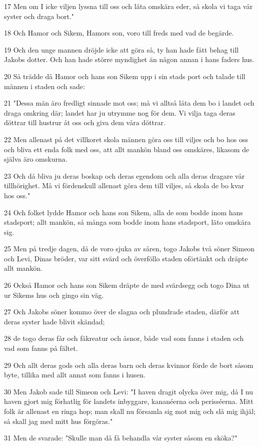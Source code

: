 \par 17 Men om I icke viljen lyssna till oss och låta omskära eder, så skola vi taga vår syster och draga bort."
\par 18 Och Hamor och Sikem, Hamors son, voro till freds med vad de begärde.
\par 19 Och den unge mannen dröjde icke att göra så, ty han hade fått behag till Jakobs dotter. Och han hade större myndighet än någon annan i hans faders hus.
\par 20 Så trädde då Hamor och hans son Sikem upp i sin stads port och talade till männen i staden och sade:
\par 21 "Dessa män äro fredligt sinnade mot oss; må vi alltså låta dem bo i landet och draga omkring där; landet har ju utrymme nog för dem. Vi vilja taga deras döttrar till hustrur åt oss och giva dem våra döttrar.
\par 22 Men allenast på det villkoret skola männen göra oss till viljes och bo hos oss och bliva ett enda folk med oss, att allt mankön bland oss omskäres, likasom de själva äro omskurna.
\par 23 Och då bliva ju deras boskap och deras egendom och alla deras dragare vår tillhörighet. Må vi fördenskull allenast göra dem till viljes, så skola de bo kvar hos oss."
\par 24 Och folket lydde Hamor och hans son Sikem, alla de som bodde inom hans stadsport; allt mankön, så många som bodde inom hans stadsport, läto omskära sig.
\par 25 Men på tredje dagen, då de voro sjuka av såren, togo Jakobs två söner Simeon och Levi, Dinas bröder, var sitt svärd och överföllo staden oförtänkt och dräpte allt mankön.
\par 26 Också Hamor och hans son Sikem dräpte de med svärdsegg och togo Dina ut ur Sikems hus och gingo sin väg.
\par 27 Och Jakobs söner kommo över de slagna och plundrade staden, därför att deras syster hade blivit skändad;
\par 28 de togo deras får och fäkreatur och åsnor, både vad som fanns i staden och vad som fanns på fältet.
\par 29 Och allt deras gods och alla deras barn och deras kvinnor förde de bort såsom byte, tillika med allt annat som fanns i husen.
\par 30 Men Jakob sade till Simeon och Levi: "I haven dragit olycka över mig, då I nu haven gjort mig förhatlig för landets inbyggare, kananéerna och perisséerna. Mitt folk är allenast en ringa hop; man skall nu församla sig mot mig och slå mig ihjäl; så skall jag med mitt hus förgöras."
\par 31 Men de svarade: "Skulle man då få behandla vår syster såsom en sköka?"

